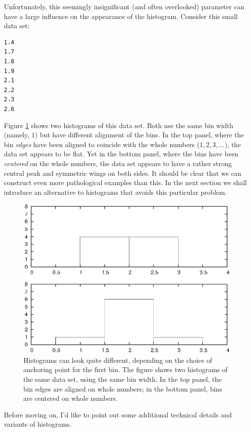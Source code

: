 Unfortunately, this seemingly insignificant (and often overlooked)
parameter can have a large influence on the appearance of the
histogram.  Consider this small data set:

\begin{verbatim}
1.4
1.7
1.8
1.9
2.1
2.2
2.3
2.6
\end{verbatim}

Figure \ref{fig:smallhisto} shows two histograms of this data set.
Both use the same bin width (namely, $1$) but have different
alignment of the bins. In the top panel, where the bin \emph{edges}
have been aligned to coincide with the whole numbers ($1, 2, 3,
\dots$), the data set appears to be flat. Yet in the bottom panel,
where the bins have been\vadjust{\pagebreak} \emph{centered} on the whole numbers, the
data set appears to have a rather strong central peak and symmetric
wings on both sides.  It should be clear that we can construct even
more pathological examples than this. In the next section we shall
introduce an alternative to histograms that avoids this particular
problem.

\begin{figure}
  \centerline{\includegraphics{img/small-histo}}
  \caption{Histograms can look quite different, depending on the
    choice of anchoring point for the first bin. The figure shows
    two histograms of the same data set, using the same bin width.
    In the top panel, the bin edges are aligned on whole numbers;
    in the bottom panel, bins are centered on whole numbers.}
  \label{fig:smallhisto}
\end{figure}

Before moving on, I'd like to point out some additional technical
details and variants of histograms.

